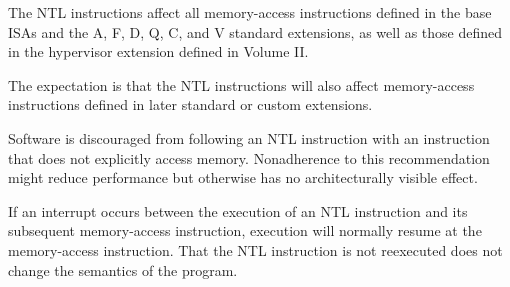 The NTL instructions affect all memory-access instructions defined in the
base ISAs and the A, F, D, Q, C, and V standard extensions,
as well as those defined in the hypervisor extension defined in Volume II.

\begin{commentary}
The expectation is that the NTL instructions will also affect memory-access
instructions defined in later standard or custom extensions.
\end{commentary}

Software is discouraged from following an NTL instruction with an
instruction that does not explicitly access memory.
Nonadherence to this recommendation might reduce performance but
otherwise has no architecturally visible effect.

\begin{commentary}
If an interrupt occurs between the execution of an NTL instruction and its
subsequent memory-access instruction, execution will normally resume at the
memory-access instruction.
That the NTL instruction is not reexecuted does not change the semantics of
the program.
\end{commentary}
